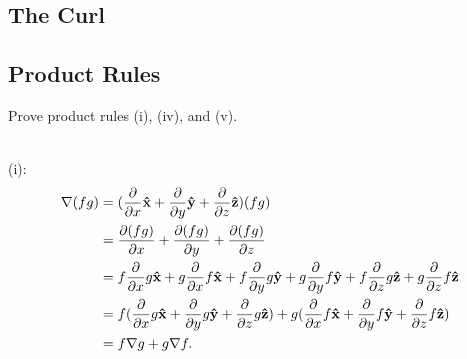             \subsection{The Curl}
            \subsection{Product Rules}
            \begin{prob}[1.21]
                Prove product rules (i), (iv), and (v).
            \end{prob}
            \begin{sol}[1.21] ~\\
                \noindent (i):
                \begin{equation}
                    \begin{aligned}
                        \nabla(fg)&=(\frac{\partial }{\partial x}\mathbf{\hat{x}} + \frac{\partial }{\partial y}\mathbf{\hat{y}} + \frac{\partial }{\partial z}\mathbf{\hat{z}})(fg) \\
                            &=\frac{\partial (fg)}{\partial x} + \frac{\partial (fg)}{\partial y} + \frac{\partial (fg)}{\partial z} \\
                            &=f\frac{\partial }{\partial x}g\mathbf{\hat{x}} + g\frac{\partial }{\partial x}f\mathbf{\hat{x}} + f\frac{\partial }{\partial y}g\mathbf{\hat{y}} 
                                + g\frac{\partial }{\partial y}f\mathbf{\hat{y}} + f\frac{\partial }{\partial z}g\mathbf{\hat{z}} + g\frac{\partial }{\partial z}f\mathbf{\hat{z}} \\
                            &=f(\frac{\partial }{\partial x}g\mathbf{\hat{x}} + \frac{\partial }{\partial y}g\mathbf{\hat{y}} + \frac{\partial }{\partial z}g\mathbf{\hat{z}}) 
                                + g(\frac{\partial }{\partial x}f\mathbf{\hat{x}} + \frac{\partial }{\partial y}f\mathbf{\hat{y}} + \frac{\partial }{\partial z}f\mathbf{\hat{z}}) \\
                            &=f \nabla g + g \nabla f.
                    \end{aligned}
                \end{equation}
            \end{sol}

